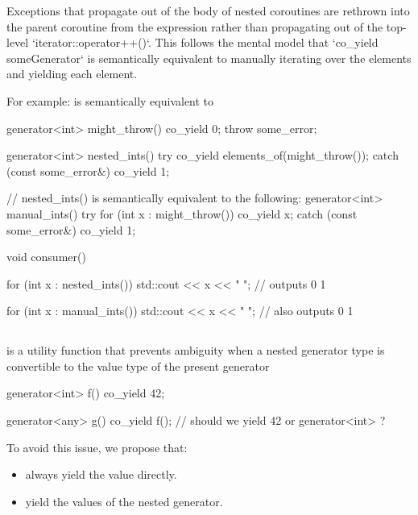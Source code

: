 \documentclass{wg21}
\begin{document}
Exceptions that propagate out of the body of nested  coroutines
are rethrown into the parent coroutine from the  expression rather
than propagating out of the top-level `iterator::operator++()`. This follows the mental model that `co_yield someGenerator` is semantically equivalent to manually
iterating over the elements and yielding each element.

For example:  is semantically equivalent to 
\begin{colorblock}
    generator<int> might_throw() {
        co_yield 0;
        throw some_error{};
    }
    
    generator<int> nested_ints() {
        try {
            co_yield elements_of(might_throw());
        } catch (const some_error&) {}
        co_yield 1;
    }
    
    // nested_ints() is semantically equivalent to the following:
    generator<int> manual_ints() {
        try {
            for (int x : might_throw()) {
                co_yield x;
            }
        } catch (const some_error&) {}
        co_yield 1;
    }
    
    void consumer() {
        for (int x : nested_ints()) {
            std::cout << x << " "; // outputs 0 1
        }
        
        for (int x : manual_ints()) {
            std::cout << x << " "; // also outputs 0 1
        }
    }
\end{colorblock}

\subsection{}

 is a utility function that prevents ambiguity when a nested generator type is convertible to the value type
of the present generator

\begin{colorblock}
    generator<int> f()
    {
        co_yield 42;
    }
    
    generator<any> g()
    {
        co_yield f(); // should we yield 42 or generator<int> ?
    }
    
\end{colorblock}

To avoid this issue, we propose that:

\begin{itemize}
    \item {} always yield the value directly.
    \item {} yield the values of the nested generator.
\end{itemize}
\end{document}
